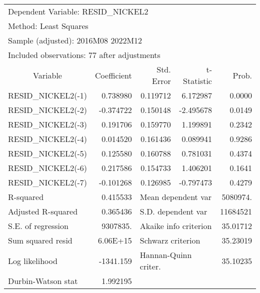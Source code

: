 
\begin{tabular}{lrrrr}
\toprule
\multicolumn{3}{l}{Dependent Variable: RESID\_NICKEL2}&\multicolumn{1}{c}{}&\multicolumn{1}{c}{}\\
\multicolumn{2}{l}{Method: Least Squares}&\multicolumn{1}{c}{}&\multicolumn{1}{c}{}&\multicolumn{1}{c}{}\\
\multicolumn{3}{l}{Sample (adjusted): 2016M08 2022M12}&\multicolumn{1}{c}{}&\multicolumn{1}{c}{}\\
\multicolumn{4}{l}{Included observations: 77 after adjustments}&\multicolumn{1}{c}{}\\
\midrule
\multicolumn{1}{c}{Variable}&\multicolumn{1}{r}{Coefficient}&\multicolumn{1}{r}{Std. Error}&\multicolumn{1}{r}{t-Statistic}&\multicolumn{1}{r}{Prob.}\\
\midrule
\multicolumn{1}{c}{RESID\_NICKEL2(-1)}&\multicolumn{1}{r}{0.738980}&\multicolumn{1}{r}{0.119712}&\multicolumn{1}{r}{6.172987}&\multicolumn{1}{r}{0.0000}\\
\multicolumn{1}{c}{RESID\_NICKEL2(-2)}&\multicolumn{1}{r}{-0.374722}&\multicolumn{1}{r}{0.150148}&\multicolumn{1}{r}{-2.495678}&\multicolumn{1}{r}{0.0149}\\
\multicolumn{1}{c}{RESID\_NICKEL2(-3)}&\multicolumn{1}{r}{0.191706}&\multicolumn{1}{r}{0.159770}&\multicolumn{1}{r}{1.199891}&\multicolumn{1}{r}{0.2342}\\
\multicolumn{1}{c}{RESID\_NICKEL2(-4)}&\multicolumn{1}{r}{0.014520}&\multicolumn{1}{r}{0.161436}&\multicolumn{1}{r}{0.089941}&\multicolumn{1}{r}{0.9286}\\
\multicolumn{1}{c}{RESID\_NICKEL2(-5)}&\multicolumn{1}{r}{0.125580}&\multicolumn{1}{r}{0.160788}&\multicolumn{1}{r}{0.781031}&\multicolumn{1}{r}{0.4374}\\
\multicolumn{1}{c}{RESID\_NICKEL2(-6)}&\multicolumn{1}{r}{0.217586}&\multicolumn{1}{r}{0.154733}&\multicolumn{1}{r}{1.406201}&\multicolumn{1}{r}{0.1641}\\
\multicolumn{1}{c}{RESID\_NICKEL2(-7)}&\multicolumn{1}{r}{-0.101268}&\multicolumn{1}{r}{0.126985}&\multicolumn{1}{r}{-0.797473}&\multicolumn{1}{r}{0.4279}\\
\midrule
\multicolumn{1}{l}{R-squared}&\multicolumn{1}{r}{0.415533}&\multicolumn{2}{l}{Mean dependent var}&\multicolumn{1}{r}{5080974.}\\
\multicolumn{1}{l}{Adjusted R-squared}&\multicolumn{1}{r}{0.365436}&\multicolumn{2}{l}{S.D. dependent var}&\multicolumn{1}{r}{11684521}\\
\multicolumn{1}{l}{S.E. of regression}&\multicolumn{1}{r}{9307835.}&\multicolumn{2}{l}{Akaike info criterion}&\multicolumn{1}{r}{35.01712}\\
\multicolumn{1}{l}{Sum squared resid}&\multicolumn{1}{r}{6.06E+15}&\multicolumn{2}{l}{Schwarz criterion}&\multicolumn{1}{r}{35.23019}\\
\multicolumn{1}{l}{Log likelihood}&\multicolumn{1}{r}{-1341.159}&\multicolumn{2}{l}{Hannan-Quinn criter.}&\multicolumn{1}{r}{35.10235}\\
\multicolumn{1}{l}{Durbin-Watson stat}&\multicolumn{1}{r}{1.992195}&\multicolumn{1}{c}{}&\multicolumn{1}{c}{}&\multicolumn{1}{c}{}\\
\bottomrule
\end{tabular}

